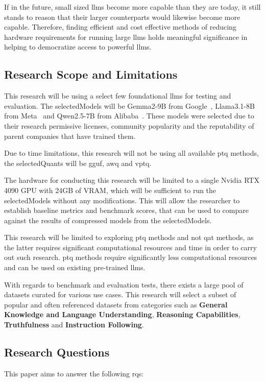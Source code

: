 \documentclass{ifacconf}
\begin{document}
	If in the future, small sized \glspl{llm} become more capable than they are today, it still stands to reason that their larger counterparts would likewise become more capable. Therefore, finding efficient and cost effective methods of reducing hardware requirements for running large \glspl{llm} holds meaningful significance in helping to democratize access to powerful \glspl{llm}.
	
	\subsection{Research Scope and Limitations}
	This research will be using a select few foundational \glspl{llm} for testing and evaluation. The \gls{selectedModels} will be Gemma2-9B from Google~\cite{gemmateam2024gemma2improvingopen}, Llama3.1-8B from Meta~\cite{dubey2024llama3herdmodels} and Qwen2.5-7B from Alibaba~\cite{qwen2.5}. These models were selected due to their research permissive licenses, community popularity and the reputability of parent companies that have trained them.
	
	Due to time limitations, this research will not be using all available \gls{ptq} methods, the \gls{selectedQuants} will be \gls{gguf}, \gls{awq} and \gls{vptq}.
	
	The hardware for conducting this research will be limited to a single Nvidia RTX 4090 GPU with 24GB of VRAM, which will be sufficient to run the \gls{selectedModels} without any modifications. This will allow the researcher to establish baseline metrics and benchmark scores, that can be used to compare against the results of compressed models from the \gls{selectedModels}.
	
	This research will be limited to exploring \gls{ptq} methods and not \gls{qat} methods, as the latter requires significant computational resources and time in order to carry out such research. \gls{ptq} methods require significantly less computational resources and can be used on existing pre-trained \glspl{llm}.
	
	With regards to benchmark and evaluation tests, there exists a large pool of datasets curated for various use cases. This research will select a subset of popular and often referenced datasets from categories such as \textbf{General Knowledge and Language Understanding}, \textbf{Reasoning Capabilities}, \textbf{Truthfulness} and \textbf{Instruction Following}.
	
	\subsection{Research Questions}
	This paper aims to answer the following \glspl{rq}:
	
\end{document}
